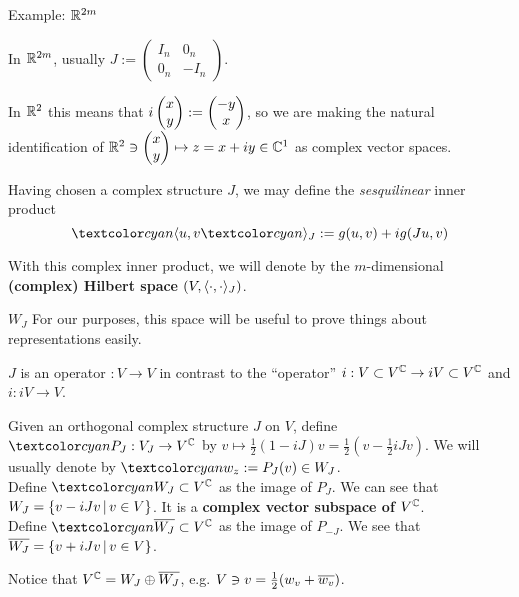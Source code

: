 \begin{frame}{Example: $\mathbb R^{2m}$} %
    
    In $\mathbb R^{2m}$, usually 
    $J := \begin{pmatrix} 
        I_n & 0_n \\
        0_n & -I_n
    \end{pmatrix}$.
    
    In $\mathbb R^2$ this means that $i \begin{pmatrix} x \\ y \end{pmatrix} := \begin{pmatrix} -y \\ x \end{pmatrix}$, so we are making the natural identification of $\mathbb R^2 \ni \begin{pmatrix} x \\ y \end{pmatrix} \mapsto z = x + iy \in \mathbb C^1$ as complex vector spaces.
    
    Having chosen a complex structure $J$, we may define the \emph{sesquilinear} inner product \[ \defn{\bra} u, v \defn{\ket_J} := g(u, v) + ig(Ju, v) \]
    
    With this complex inner product, we will denote by  the $m$-dimensional \textbf{(complex) Hilbert space} $(V, \langle \cdot, \cdot \rangle_J)$.
    
    
    
\end{frame}

\begin{frame}{$W_J$} %
    For our purposes, this space will be useful to prove things about representations easily.
    
    $J$ is an operator $:V \to V$ in contrast to the ``operator'' $i: V\subset V^\mathbb C \to iV \subset V^\mathbb C$ and $i:iV \to V$.
    
    \begin{definition}
    Given an orthogonal complex structure $J$ on $V$, define $\defn{P_J}: V_J \to V^\CC$ by $v \mapsto \frac{1}{2}(1 - iJ)v = \frac{1}{2}(v - \frac{1}{2}iJv)$. We will usually denote by $\defn{w_z} := P_J(v) \in W_J$.\\
    Define $\defn{W_J} \subset V^\CC$ as the image of $P_J$. We can see that $W_J = \{v - iJv \,|\, v \in V\}$. It is a \textbf{complex vector subspace of $V^\mathbb C$}.\\
    Define $\defn{\conj{W_J}} \subset V^\CC$ as the image of $P_{-J}$. We see that $\overline{W_J} = \{v + iJv \,|\, v \in V\}$.
    \end{definition}
    
    Notice that $V^\mathbb C = W_J \oplus \overline{W_J}$, e.g. $V \ni v = \frac{1}{2}(w_v  + \overline{w_v})$.
    
\end{frame}

